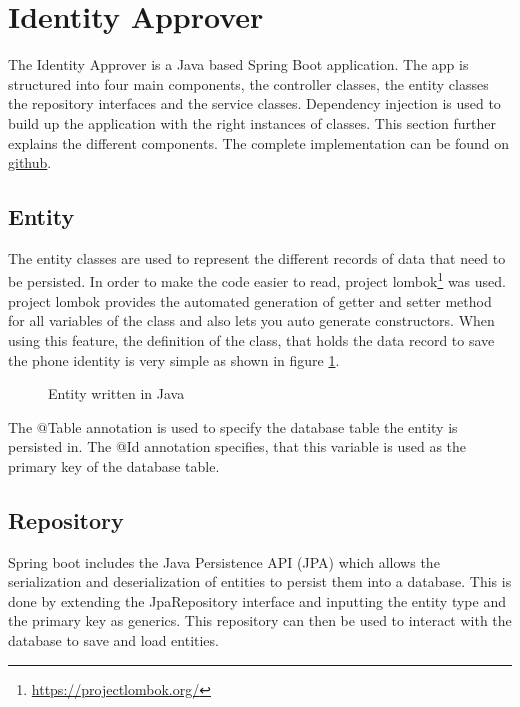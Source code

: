 \section{Identity Approver}\label{imp:dientiy}
The Identity Approver is a Java based Spring Boot application. The app is structured into four main components, the controller classes, the entity classes the repository interfaces and the service classes. Dependency injection is used to build up the application with the right instances of classes.
This section further explains the different components. The complete implementation can be found on \href{https://github.com/bc-ticketing/identity-approver}{github}.

\subsection{Entity}
The entity classes are used to represent the different records of data that need to be persisted. In order to make the code easier to read, project lombok\footnote{\url{https://projectlombok.org/}} was used. project lombok provides the automated generation of getter and setter method for all variables of the class and also lets you auto generate constructors. When using this feature, the definition of the class, that holds the data record to save the phone identity is very simple as shown in figure \ref{code:entity}. 


\begin{figure}[H]
    
    \caption{Entity written in Java}
    \label{code:entity}
\end{figure}

The @Table annotation is used to specify the database table the entity is persisted in. The @Id annotation specifies, that this variable is used as the primary key of the database table.




\subsection{Repository}
Spring boot includes the Java Persistence API (JPA) which allows the serialization and deserialization of entities to persist them into a database. This is done by extending the JpaRepository interface and inputting the entity type and the primary key as generics. This repository can then be used to interact with the database to save and load entities. 

